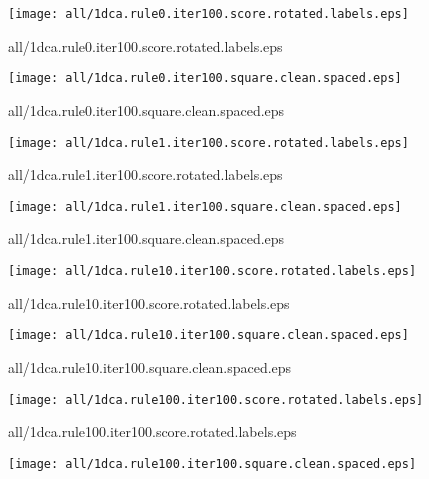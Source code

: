 \documentclass{article}
\begin{document}
\begin{center}
\begin{minipage}{\textwidth}
\texttt{[image: all/1dca.rule0.iter100.score.rotated.labels.eps]}
\end{minipage}
\end{center}
{\footnotesize all/1dca.rule0.iter100.score.rotated.labels.eps}
\begin{center}
\begin{minipage}{\textwidth}
\texttt{[image: all/1dca.rule0.iter100.square.clean.spaced.eps]}
\end{minipage}
\end{center}
{\footnotesize all/1dca.rule0.iter100.square.clean.spaced.eps}
\begin{center}
\begin{minipage}{\textwidth}
\texttt{[image: all/1dca.rule1.iter100.score.rotated.labels.eps]}
\end{minipage}
\end{center}
{\footnotesize all/1dca.rule1.iter100.score.rotated.labels.eps}
\begin{center}
\begin{minipage}{\textwidth}
\texttt{[image: all/1dca.rule1.iter100.square.clean.spaced.eps]}
\end{minipage}
\end{center}
{\footnotesize all/1dca.rule1.iter100.square.clean.spaced.eps}
\begin{center}
\begin{minipage}{\textwidth}
\texttt{[image: all/1dca.rule10.iter100.score.rotated.labels.eps]}
\end{minipage}
\end{center}
{\footnotesize all/1dca.rule10.iter100.score.rotated.labels.eps}
\begin{center}
\begin{minipage}{\textwidth}
\texttt{[image: all/1dca.rule10.iter100.square.clean.spaced.eps]}
\end{minipage}
\end{center}
{\footnotesize all/1dca.rule10.iter100.square.clean.spaced.eps}
\begin{center}
\begin{minipage}{\textwidth}
\texttt{[image: all/1dca.rule100.iter100.score.rotated.labels.eps]}
\end{minipage}
\end{center}
{\footnotesize all/1dca.rule100.iter100.score.rotated.labels.eps}
\begin{center}
\begin{minipage}{\textwidth}
\texttt{[image: all/1dca.rule100.iter100.square.clean.spaced.eps]}
\end{minipage}
\end{center}
\end{document}
